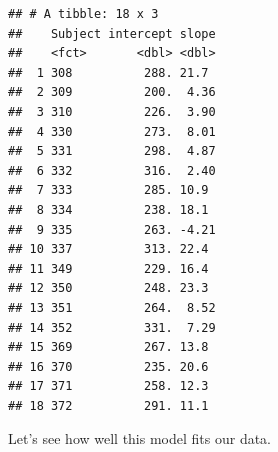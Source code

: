 \documentclass[]{book}
\newenvironment{Shaded}{\begin{snugshade}}{\end{snugshade}}
\newcommand{\CommentTok}[1]{\textcolor[rgb]{0.56,0.35,0.01}{\textit{#1}}}
\newcommand{\DataTypeTok}[1]{\textcolor[rgb]{0.13,0.29,0.53}{#1}}
\newcommand{\DecValTok}[1]{\textcolor[rgb]{0.00,0.00,0.81}{#1}}
\newcommand{\KeywordTok}[1]{\textcolor[rgb]{0.13,0.29,0.53}{\textbf{#1}}}
\newcommand{\NormalTok}[1]{#1}
\newcommand{\OperatorTok}[1]{\textcolor[rgb]{0.81,0.36,0.00}{\textbf{#1}}}
\newcommand{\StringTok}[1]{\textcolor[rgb]{0.31,0.60,0.02}{#1}}
\begin{document}
\begin{Shaded}
\end{Shaded}

\begin{verbatim}
## # A tibble: 18 x 3
##    Subject intercept slope
##    <fct>       <dbl> <dbl>
##  1 308          288. 21.7 
##  2 309          200.  4.36
##  3 310          226.  3.90
##  4 330          273.  8.01
##  5 331          298.  4.87
##  6 332          316.  2.40
##  7 333          285. 10.9 
##  8 334          238. 18.1 
##  9 335          263. -4.21
## 10 337          313. 22.4 
## 11 349          229. 16.4 
## 12 350          248. 23.3 
## 13 351          264.  8.52
## 14 352          331.  7.29
## 15 369          267. 13.8 
## 16 370          235. 20.6 
## 17 371          258. 12.3 
## 18 372          291. 11.1
\end{verbatim}

Let's see how well this model fits our data.
\end{document}
